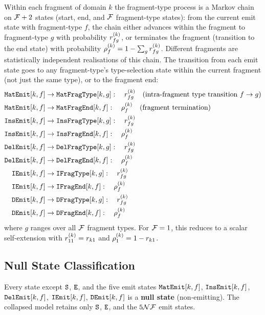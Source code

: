 Within each fragment of domain $k$ the fragment-type process
is a Markov chain on $\mathcal{F}+2$ states (start, end, and $\mathcal{F}$ fragment-type
states): from the current emit state with fragment-type $f$, the chain
either advances within the fragment to fragment-type $g$ with probability
$r^{(k)}_{fg}$, or terminates the fragment (transition to the end state)
with probability $\rho^{(k)}_f = 1 - \sum_g r^{(k)}_{fg}$. Different
fragments are statistically independent realisations of this chain.
The transition from each emit state goes to any fragment-type's type-selection
state within the current fragment (not just the same type), or to the fragment end:
\begin{align}
\mathtt{MatEmit}[k,f] &\to \mathtt{MatFragType}[k,g]: \quad r^{(k)}_{fg} \quad\text{(intra-fragment type transition $f \to g$)} \\
\mathtt{MatEmit}[k,f] &\to \mathtt{MatFragEnd}[k,f]: \quad \rho^{(k)}_f \quad\text{(fragment termination)} \\
\mathtt{InsEmit}[k,f] &\to \mathtt{InsFragType}[k,g]: \quad r^{(k)}_{fg}  \\
\mathtt{InsEmit}[k,f] &\to \mathtt{InsFragEnd}[k,f]: \quad \rho^{(k)}_f  \\
\mathtt{DelEmit}[k,f] &\to \mathtt{DelFragType}[k,g]: \quad r^{(k)}_{fg}  \\
\mathtt{DelEmit}[k,f] &\to \mathtt{DelFragEnd}[k,f]: \quad \rho^{(k)}_f  \\
\mathtt{IEmit}[k,f] &\to \mathtt{IFragType}[k,g]: \quad r^{(k)}_{fg}  \\
\mathtt{IEmit}[k,f] &\to \mathtt{IFragEnd}[k,f]: \quad \rho^{(k)}_f  \\
\mathtt{DEmit}[k,f] &\to \mathtt{DFragType}[k,g]: \quad r^{(k)}_{fg}  \\
\mathtt{DEmit}[k,f] &\to \mathtt{DFragEnd}[k,f]: \quad \rho^{(k)}_f
\end{align}
where $g$ ranges over all $\mathcal{F}$ fragment types.
For $\mathcal{F} = 1$, this reduces to a scalar self-extension with
$r^{(k)}_{11} = r_{k1}$ and $\rho^{(k)}_1 = 1 - r_{k1}$.

\subsection{Null State Classification}

Every state except ${\tt S}$, ${\tt E}$, and the five emit states
$\mathtt{MatEmit}[k,f]$, $\mathtt{InsEmit}[k,f]$, $\mathtt{DelEmit}[k,f]$,
$\mathtt{IEmit}[k,f]$, $\mathtt{DEmit}[k,f]$ is a \textbf{null state}
(non-emitting). The collapsed model retains only ${\tt S}$, ${\tt E}$, and
the $5\mathcal{N}\mathcal{F}$ emit states.

